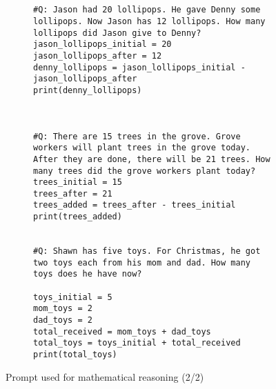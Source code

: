 \documentclass[dvipsnames]{article} \usepackage[accepted]{icml2022}
\begin{document}
\begin{figure*}[!h]
\centering
\begin{subfigure}[t]{.99\textwidth}
\begin{verbatim}


#Q: Jason had 20 lollipops. He gave Denny some lollipops. Now Jason has 12 lollipops. How many lollipops did Jason give to Denny?
jason_lollipops_initial = 20
jason_lollipops_after = 12
denny_lollipops = jason_lollipops_initial - jason_lollipops_after
print(denny_lollipops)



#Q: There are 15 trees in the grove. Grove workers will plant trees in the grove today. After they are done, there will be 21 trees. How many trees did the grove workers plant today?
trees_initial = 15
trees_after = 21
trees_added = trees_after - trees_initial
print(trees_added)


#Q: Shawn has five toys. For Christmas, he got two toys each from his mom and dad. How many toys does he have now?

toys_initial = 5
mom_toys = 2
dad_toys = 2
total_received = mom_toys + dad_toys
total_toys = toys_initial + total_received
print(total_toys)

\end{verbatim}
\label{fig:mathsprompt:oursparttwo}
\end{subfigure}
\caption{Prompt used for mathematical reasoning (2/2)}
 \end{figure*}

\newpage
\clearpage
\end{document}
